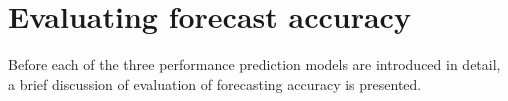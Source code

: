 \newpage

\section{Evaluating forecast accuracy} \label{Forecast_Accuracy}

Before each of the three performance prediction models are introduced in detail, a brief discussion of evaluation of forecasting accuracy is presented.

